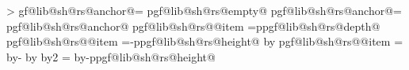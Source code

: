 {{        \fi%
        \ifpgfrectanglesplithorizontal%
            \pgf@x=0pt\relax%
            \pgfmathloop%
                \ifnum\pgfmathcounter>\parts%
                \else%
                    \pgf@lib@sh@getalpha\pgf@lib@sh@rs@number{\pgfmathcounter}%
                    \expandafter\let\csname pgf@lib@sh@rs@anchor@\pgf@lib@sh@rs@number\endcsname=\pgfutil@empty%
                    \expandafter\ifx\csname pgf@lib@sh@rs@empty@\pgf@lib@sh@rs@number\endcsname\pgfutil@empty%
                        \ifpgfrectanglesplitignoreemptyparts%
                            \expandafter\let\csname pgf@lib@sh@rs@anchor@\pgf@lib@sh@rs@number\endcsname=%
                                \pgf@lib@sh@rs@lastanchor%
                        \fi%
                    \fi%
                    \expandafter\ifx\csname pgf@lib@sh@rs@anchor@\pgf@lib@sh@rs@number\endcsname\pgfutil@empty%
                        \expandafter\ifx\csname pgf@lib@sh@rs@\pgf@lib@sh@rs@number @item\endcsname%
                                \pgf@lib@sh@rs@bottomtext%
                            \pgf@y=\csname pgf@lib@sh@rs@depth@\pgf@lib@sh@rs@number\endcsname\relax%
                        \else%
                            \expandafter\ifx\csname pgf@lib@sh@rs@\pgf@lib@sh@rs@number @item\endcsname%
                                    \pgf@lib@sh@rs@toptext%
                                \pgf@y=-\csname pgf@lib@sh@rs@height@\pgf@lib@sh@rs@number\endcsname\relax%
                                \advance\pgf@y by\pgf@lib@sh@rs@max@totalheight\relax%
                            \else%
                                \expandafter\ifx\csname pgf@lib@sh@rs@\pgf@lib@sh@rs@number @item\endcsname%
                                        \pgf@lib@sh@rs@basetext%
                                    \pgf@y=\pgf@lib@sh@rs@max@totalheight\relax%
                                    \advance\pgf@y by-\pgfutil@tempdima%
                                    \advance\pgf@y by\pgfutil@tempdimb%
                                    \divide\pgf@y by2\relax%
                                \else%
                                    \pgf@y=\pgf@lib@sh@rs@max@totalheight\relax%
                                    \advance\pgf@y by-\csname pgf@lib@sh@rs@height@\pgf@lib@sh@rs@number\endcsname\relax%
}}
